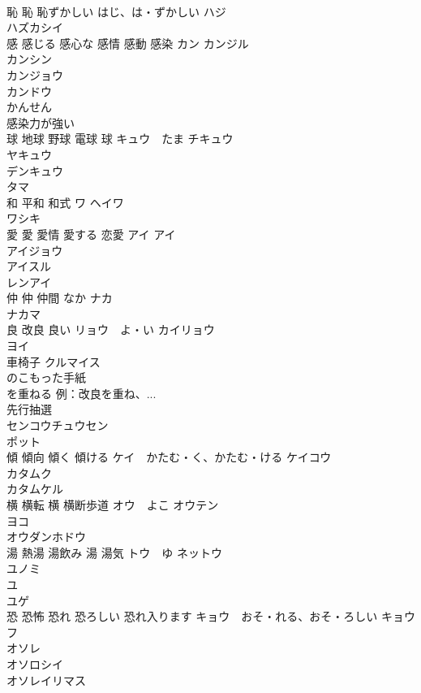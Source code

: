 \documentclass[8pt]{extreport}
\begin{document}
\begin{CJK}{UTF8}{min}
\\	恥 恥 恥ずかしい	はじ、は・ずかしい ハジ 
\\	ハズカシイ
\\	感 感じる 感心な 感情 感動 感染	カン カンジル 
\\	カンシン 
\\	カンジョウ 
\\	カンドウ 
\\	かんせん
\\	感染力が強い 
\\	球 地球 野球 電球 球	キュウ　たま チキュウ 
\\	ヤキュウ 
\\	デンキュウ 
\\	タマ 
\\	和 平和 和式	ワ ヘイワ 
\\	ワシキ 
\\	愛 愛 愛情 愛する 恋愛	アイ アイ 
\\	アイジョウ 
\\	アイスル 
\\	レンアイ 
\\	仲 仲 仲間	なか ナカ 
\\	ナカマ 
\\	良 改良 良い	リョウ　よ・い カイリョウ 
\\	ヨイ 
\\	車椅子	クルマイス 
\\	のこもった手紙	
\\	を重ねる 例：改良を重ね、...	
\\	先行抽選	
\\	センコウチュウセン
\\	ポット	
\\	傾 傾向 傾く 傾ける	ケイ　かたむ・く、かたむ・ける ケイコウ 
\\	カタムク 
\\	カタムケル 
\\	横 横転 横 横断歩道	オウ　よこ オウテン 
\\	ヨコ 
\\	オウダンホドウ 
\\	湯 熱湯 湯飲み 湯 湯気	トウ　ゆ ネットウ 
\\	ユノミ 
\\	ユ 
\\	ユゲ 
\\	恐 恐怖 恐れ 恐ろしい 恐れ入ります	キョウ　おそ・れる、おそ・ろしい キョウフ
\\	オソレ
\\	オソロシイ 
\\	オソレイリマス 

\end{CJK}
\end{document}
